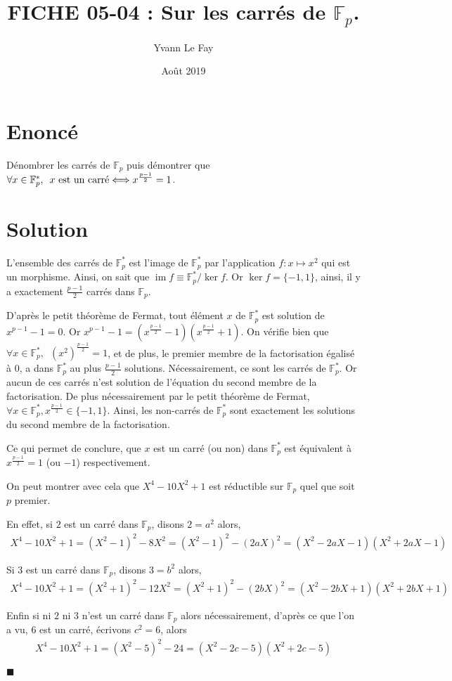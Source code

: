 \documentclass{article}
\newcommand*{\QED}{\hfill\ensuremath{\blacksquare}}%
\DeclareMathOperator{\im}{im}
\begin{document}
\title{FICHE 05-04 : Sur les carrés de $\mathbb{F}_p$.}
\author{Yvann Le Fay}
\date{Août 2019}
\maketitle
\section*{Enoncé}
Dénombrer les carrés de $\mathbb{F}_p$ puis démontrer que $\forall x \in \mathbb{F}_p^*,\,\,\, x  \textup{ est un carré} \Longleftrightarrow x^{\frac{p-1}{2}} = 1$.
\section*{Solution}
L'ensemble des carrés de $\mathbb{F}_p^*$ est l'image de $\mathbb{F}_p^*$ par l'application $f : x \mapsto x^2$ qui est un morphisme. Ainsi, on sait que $\im f \equiv \mathbb{F}_p^*/\ker f$. Or $\ker f = \{-1, 1\}$, ainsi, il y a exactement $\frac{p-1}{2}$ carrés dans $\mathbb{F}_p$.

D'après le petit théorème de Fermat, tout élément $x$ de $\mathbb{F}_p^*$ est solution de $x^{p-1} - 1 = 0$. Or $x^{p-1}  - 1 = (x^{\frac{p-1}{2}}-1)(x^{\frac{p-1}{2}}+1)$. On vérifie bien que $\forall x \in \mathbb{F}_p^*,\,\,\, (x^2)^{\frac{p-1}{2}} = 1$, et de plus, le premier membre de la factorisation égalisé à $0$, a dans $\mathbb{F}_p^*$ au plus $\frac{p-1}{2}$ solutions. Nécessairement, ce sont les carrés de $\mathbb{F}_p^*$. Or aucun de ces carrés n'est solution de l'équation du second membre de la factorisation. De plus nécessairement par le petit théorème de Fermat, $\forall x \in \mathbb{F}_p^*, x^{\frac{p-1}{2}} \in \{-1, 1\}$. Ainsi, les non-carrés de $\mathbb{F}_p^*$ sont exactement les solutions du second membre de la factorisation. 

Ce qui permet de conclure, que $x$ est un carré (ou non) dans $\mathbb{F}_p^*$ est équivalent à $x^{\frac{p-1}{2}} = 1$ (ou $-1$) respectivement.

On peut montrer avec cela que $X^4-10X^2+1$ est réductible sur $\mathbb{F}_p$ quel que soit $p$ premier. 

En effet, si $2$ est un carré dans $\mathbb{F}_p$, disons $2 = a^2$ alors, 
\begin{align*}
	X^4-10X^2 + 1 = (X^2-1)^2 - 8X^2 = (X^2-1)^2 - (2aX)^2 = (X^2-2aX-1)(X^2+2aX-1)
\end{align*}

Si $3$ est un carré dans $\mathbb{F}_p$, disons $3 = b^2$ alors,
\begin{align*}
	X^4-10X^2 + 1 = (X^2+1)^2 - 12X^2 = (X^2+1)^2 - (2bX)^2 = (X^2-2bX+1)(X^2+2bX+1)
\end{align*}

Enfin si ni $2$ ni $3$ n'est un carré dans $\mathbb{F}_p$ alors nécessairement, d'après ce que l'on a vu, $6$ est un carré, écrivons $c^2 = 6$, alors
\begin{align*}
	X^4-10X^2 + 1 = (X^2-5)^2 - 24 = (X^2-2c-5)(X^2+2c-5)
\end{align*}

\QED
\end{document}
